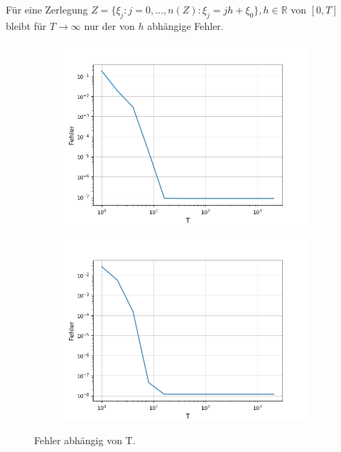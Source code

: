 \documentclass[12pt,a4paper]{scrartcl}
\numberwithin{equation}{section}
\numberwithin{myalgctr}{section}
\numberwithin{mytheoremctr}{subsection}
\numberwithin{mykorollarctr}{subsection}
\numberwithin{mylemmactr}{subsection}
\numberwithin{mybeispielctr}{subsection}
\begin{document}
	F\"ur eine Zerlegung $Z = \{\xi_j:j=0,\dots,n(Z):\xi_j = jh+\xi_0\} , h\in \mathbb{R}$ von $[0,T]$ bleibt f\"ur $T\to\infty$ nur der von $h$ abh\"angige Fehler.
	 	
	\begin{figure}[H]
		\begin{subfigure}[t]{0.5\textwidth}
			\includegraphics[width=\linewidth]{Fehlerplothsinx.png}
			 \label{fig:fehlerplothsinx}
		\end{subfigure}
		\begin{subfigure}[t]{0.5\textwidth}
			\includegraphics[width=\linewidth]{Fehlerplothexp.png}
			 \label{fig:fehlerplothexp}
		\end{subfigure}
		\caption{Fehler abhängig von T.}
		\label{fig:fehlerploth}
	\end{figure}
\end{document}
